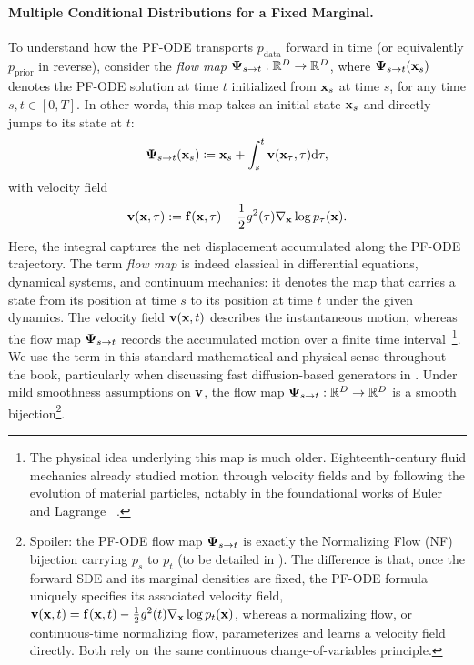 \paragraph{Multiple Conditional Distributions for a Fixed Marginal.}
To understand how the PF-ODE transports $p_{\mathrm{data}}$ forward in time (or equivalently $p_{\mathrm{prior}}$ in reverse), consider the \emph{flow map} ${\bm{\Psi}}_{s \to t}: \mathbb{R}^D \to \mathbb{R}^D$, where ${\bm{\Psi}}_{s \to t}({\mathbf{x}}_s)$ denotes the PF-ODE solution at time $t$ initialized from ${\mathbf{x}}_s$ at time $s$, for any time $s, t \in[0,T]$. In other words, this map takes an initial state ${\mathbf{x}}_s$ and directly jumps to its state at $t$:
\begin{align}\label{eq:flow-map-def}
{\bm{\Psi}}_{s \to t}({\mathbf{x}}_s) \coloneqq {\mathbf{x}}_s + \int_s^t {\mathbf{v}}({\mathbf{x}}_\tau, \tau)\mathrm{d}\tau,
\end{align}
with velocity field
\begin{align*}
{\mathbf{v}}({\mathbf{x}}, \tau) := {\mathbf{f}}({\mathbf{x}}, \tau) - \frac{1}{2} g^2(\tau)\nabla_{{\mathbf{x}}}\log p_\tau({\mathbf{x}}).
\end{align*}
Here, the integral captures the net displacement accumulated along the
PF-ODE trajectory. The term \emph{flow map} is indeed classical in
differential equations, dynamical systems, and continuum mechanics: it
denotes the map that carries a state from its position at time $s$ to its
position at time $t$ under the given dynamics. The velocity field
${\mathbf{v}}({\mathbf{x}},t)$ describes the instantaneous motion, whereas the flow map
${\bm{\Psi}}_{s\to t}$ records the accumulated motion over a finite time
interval~\citep{arnold1988geometrical,chorin1993mathematical}\footnote{The physical idea underlying this map is much
older. Eighteenth-century fluid mechanics already studied motion through
velocity fields and by following the evolution of material particles,
notably in the foundational works of Euler and Lagrange
~\citep{euler1757fluid,lagrange1783fluid}.}. We use the term in this standard mathematical and physical sense
throughout the book, particularly when discussing fast diffusion-based
generators in . Under mild smoothness assumptions on ${\mathbf{v}}$, the flow map
${\bm{\Psi}}_{s \to t}: \mathbb{R}^D \to \mathbb{R}^D$ is a smooth
bijection\footnote{%
Spoiler: the PF-ODE flow map ${\bm{\Psi}}_{s\to t}$ is exactly the Normalizing
Flow (NF) bijection carrying $p_s$ to $p_t$ (to be detailed in
). The difference is that, once the forward SDE and its marginal densities
are fixed, the PF-ODE formula uniquely specifies its associated velocity
field, ${\mathbf{v}}({\mathbf{x}},t)
=
{\mathbf{f}}({\mathbf{x}},t)
-\frac{1}{2}g^2(t)\nabla_{{\mathbf{x}}}\log p_t({\mathbf{x}})$,
whereas a normalizing flow, or continuous-time normalizing flow,
parameterizes and learns a velocity field directly. Both rely on the same
continuous change-of-variables principle.
}.




